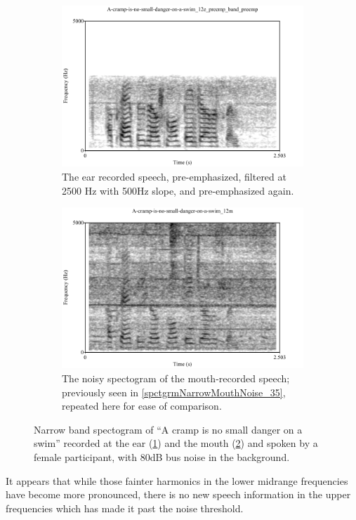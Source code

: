 \documentclass[dissertation,copyright]{uathesis}
\begin{document}
\begin{figure}[b!]
\centering
\begin{subfigure}{0.475\textwidth}
  \centering
  \includegraphics[width=1\linewidth]{figure/spctgrmNarrowEarNoisePrempFiltPremp.pdf}
  \caption{The ear recorded speech, pre-emphasized, filtered at 2500 Hz with 500Hz slope, and pre-emphasized again.}
  \label{spctgrmNarrowEarNoisePrempFiltPremp_35}
\end{subfigure}%
\hfill
\begin{subfigure}{0.475\textwidth}
  \centering
  \includegraphics[width=1\linewidth]{figure/spctgrmNarrowMthNoise_35.pdf}
  \caption{The noisy spectogram of the mouth-recorded speech; previously seen in \ref{spctgrmNarrowMouthNoise_35}, repeated here for ease of comparison.}
  \label{spctgrmNarrowMouthNoise_35_compare}
\end{subfigure}
\caption{Narrow band spectogram of ``A cramp is no small danger on a swim'' recorded at the ear (\ref{spctgrmNarrowEarNoisePrempFiltPremp_35}) and the mouth (\ref{spctgrmNarrowMouthNoise_35_compare}) and spoken by a female participant, with 80dB bus noise in the background.}
\label{fig:ear_pfp}
\end{figure}
It appears that while those fainter harmonics in the lower midrange frequencies have become more pronounced, there is no new speech information in the upper frequencies which has made it past the noise threshold.
\end{document}
